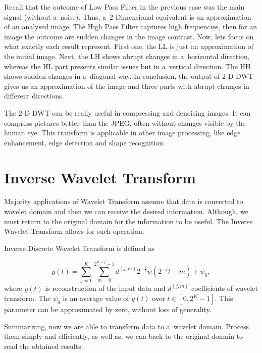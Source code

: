 Recall that the outcome of Low Pass Filter in the previous case was the main signal (without a~noise). Thus, a~2-Dimensional equivalent is an approximation of an analysed image. The High Pass Filter captures high frequencies, then for an image the outcome are sudden changes in the image contrast. Now, lets focus on what exactly each result represent. First one, the LL is just an approximation of the initial image. Next, the LH shows abrupt changes in a~horizontal direction, whereas the HL part presents similar issues but in a~vertical direction. The HH shows sudden changes in a~diagonal way. In conclusion, the output of 2-D DWT gives us an approximation of the image and three parts with abrupt changes in different directions.

The 2-D DWT can be really useful in compressing and denoising images. It can compress pictures better than the JPEG, often without changes visible by the human eye. This transform is applicable in other image processing, like edge enhancement, edge detection and shape recognition.


\section{Inverse Wavelet Transform}

Majority applications of Wavelet Transform assume that data is converted to wavelet domain and then we can receive the desired information. Although, we must return to the original domain for the information to be useful. The Inverse Wavelet Transform allows for such operation.

\begin{defn}
Inverse Discrete Wavelet Transform is defined as

\begin{equation}
y(t) = \sum_{j=1}^{K} \sum_{m=0}^{2^{K-j}-1} d^{(j,m)} 2^{-\frac{j}{2}} \psi\left(2^{-j}t - m\right) + \psi_0,
\end{equation}
where $y(t)$ is reconstruction of the input data and $d^{(j,m)}$ coefficients of wavelet transform. The $\psi_0$ is an average value of $y(t)$ over $t \in [0, 2^K-1]$. This parameter can be approximated by zero, without loss of generality.
\end{defn}

Summarizing, now we are able to transform data to a~wavelet domain. Process them simply and efficiently, as well as, we can back to the original domain to read the obtained results.

